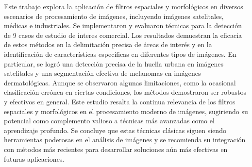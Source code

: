 Este trabajo explora la aplicación de filtros espaciales y morfológicos en diversos escenarios de procesamiento de imágenes, incluyendo imágenes satelitales, médicas e industriales. Se implementaron y evaluaron técnicas para la detección de 9 casos de estudio de interes comercial. Los resultados demuestran la eficacia de estos métodos en la delimitación precisa de áreas de interés y en la identificación de características específicas en diferentes tipos de imágenes. En particular, se logró una detección precisa de la huella urbana en imágenes satelitales y una segmentación efectiva de melanomas en imágenes dermatológicas. Aunque se observaron algunas limitaciones, como la ocasional clasificación errónea en ciertas condiciones, los métodos demostraron ser robustos y efectivos en general. Este estudio resalta la continua relevancia de los filtros espaciales y morfológicos en el procesamiento moderno de imágenes, sugiriendo su potencial como complemento valioso a técnicas más avanzadas como el aprendizaje profundo. Se concluye que estas técnicas clásicas siguen siendo herramientas poderosas en el análisis de imágenes y se recomienda su integración con métodos más recientes para desarrollar soluciones aún más efectivas en futuras aplicaciones.